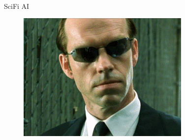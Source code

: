 \documentclass[10pt]{beamer}
\begin{document}
\begin{frame} {SciFi AI}
\begin{figure}
\begin{minipage}{.33\textwidth}
			\begin{minipage}{\textwidth}
			  \includegraphics[width=0.8 \linewidth, height=0.8 \textheight, keepaspectratio]{images/smith}
			\end{minipage}
		\end{minipage}%
		\begin{minipage}{.33\textwidth}
		\end{minipage}
	\end{figure}
\end{frame}
\end{document}
